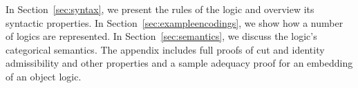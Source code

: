 In Section~\ref{sec:syntax}, we present the rules of the logic and
overview its syntactic properties.  In
Section~\ref{sec:exampleencodings}, we show how a number of logics are
represented.  In Section~\ref{sec:semantics}, we discuss the logic's
categorical semantics.  The appendix includes full proofs of cut and
identity admissibility and other properties and a sample adequacy proof
for an embedding of an object logic.

